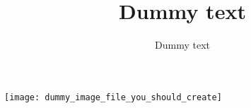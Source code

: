 \documentclass{article}
\begin{document}
\title{Dummy text}
\date{Dummy text}
\maketitle
\begin{center}
\begin{minipage}{0.3\textwidth}
\texttt{[image: dummy\_image\_file\_you\_should\_create]}
\end{minipage}
\end{center}
\end{document}
